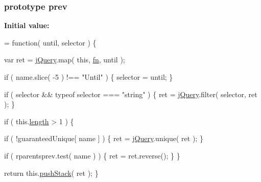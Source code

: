 \subsubsection[{prev}]{ {\bf prototype} prev}\label{jquery-1_810_82-vsdoc_8js_a7352f8050024693a3c6cce9e507d4af2}
{\bfseries Initial value\+:}
\begin{DoxyCode}
= \textcolor{keyword}{function}( until, selector ) \{


        var ret = \hyperlink{jquery-1_810_82-vsdoc_8js_add5237586d970a38a81f990e8eb28c6c}{jQuery}.map( \textcolor{keyword}{this}, \hyperlink{jquery-1_810_82-vsdoc_8js_acef6bdaf6b9b20fdcca1ea86f0902c3b}{fn}, until );

        \textcolor{keywordflow}{if} ( name.slice( -5 ) !== \textcolor{stringliteral}{"Until"} ) \{
            selector = until;
        \}

        \textcolor{keywordflow}{if} ( selector && typeof selector === \textcolor{stringliteral}{"string"} ) \{
            ret = \hyperlink{jquery-1_810_82-vsdoc_8js_add5237586d970a38a81f990e8eb28c6c}{jQuery}.filter( selector, ret );
        \}

        \textcolor{keywordflow}{if} ( this.\hyperlink{jquery-1_810_82-vsdoc_8js_aa7de35d58da66d9944ab9cbe82c19640}{length} > 1 ) \{
            
            \textcolor{keywordflow}{if} ( !guaranteedUnique[ name ] ) \{
                ret = \hyperlink{jquery-1_810_82-vsdoc_8js_add5237586d970a38a81f990e8eb28c6c}{jQuery}.unique( ret );
            \}

            
            \textcolor{keywordflow}{if} ( rparentsprev.test( name ) ) \{
                ret = ret.reverse();
            \}
        \}

        \textcolor{keywordflow}{return} this.\hyperlink{jquery-1_810_82-vsdoc_8js_afc3a7db1ef2b526338c06c07cecccd44}{pushStack}( ret );
    \}
\end{DoxyCode}
\hypertarget{jquery-1_810_82-vsdoc_8js_a919573a4164877583504b17f0594a6a1}{}
